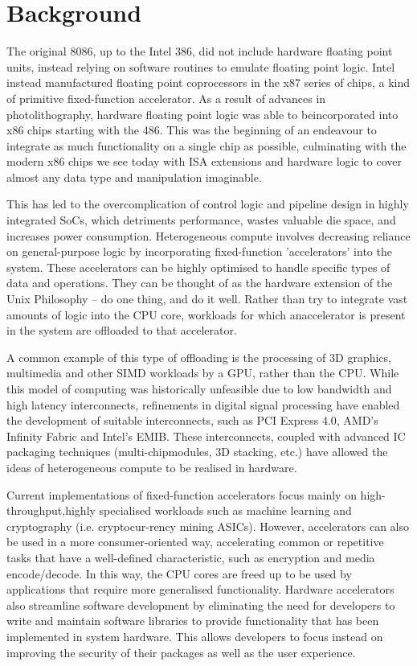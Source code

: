 \documentclass[12pt]{report}
\begin{document}
\newpage

\section{Background}
The original 8086, up to the Intel 386, did not include hardware floating point units, instead relying on software routines
to emulate floating point logic. Intel instead manufactured floating point coprocessors in the x87 series of chips, a kind
of primitive fixed-function accelerator. As a result of advances in photolithography, hardware floating point logic was
able to beincorporated into x86 chips starting with the 486. This was the beginning of an endeavour to integrate as much
functionality on a single chip as possible, culminating  with  the modern x86 chips we see today with ISA extensions and
hardware logic to cover almost any data type and manipulation imaginable.

This has led to the overcomplication of control logic and pipeline design in highly integrated SoCs, which detriments
performance, wastes valuable die space, and  increases power consumption. Heterogeneous compute involves decreasing
reliance on general-purpose logic by  incorporating fixed-function ’accelerators’ into the system. These accelerators
can be highly optimised to handle specific types of data and operations. They can be thought of as the hardware extension
of the Unix Philosophy – do one thing, and do it well. Rather than try to integrate vast amounts of logic into the CPU
core, workloads for which anaccelerator is present in the system are offloaded to that accelerator. 

A common example of this type of offloading is the processing of 3D graphics, multimedia and other SIMD workloads by a GPU,
rather than the CPU. While this model of computing was historically unfeasible due to low bandwidth and high latency 
interconnects, refinements in digital signal processing have enabled the development of suitable interconnects, such as
PCI Express 4.0, AMD’s Infinity Fabric and Intel’s EMIB. These interconnects, coupled with advanced IC packaging
techniques (multi-chipmodules, 3D stacking, etc.) have allowed the ideas of heterogeneous compute to be realised in hardware.

Current implementations of fixed-function accelerators focus mainly on high-throughput,highly specialised workloads such
as machine learning and cryptography (i.e.  cryptocur-rency mining ASICs). However, accelerators can also be used in a
more consumer-oriented way, accelerating common or repetitive tasks that have a well-defined characteristic, such as
encryption and media encode/decode. In this way, the CPU cores are freed up to be used by applications that require more
generalised functionality. Hardware accelerators also streamline software development by eliminating the need for developers
to write and maintain software libraries to provide functionality that has been implemented in system hardware. This allows
developers to focus instead on improving the security of their packages as well as the user experience.
\end{document}
